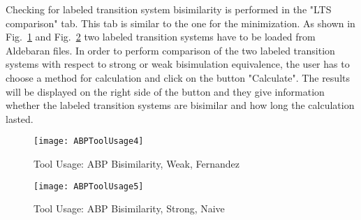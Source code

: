 Checking for labeled transition system bisimilarity is performed in the "LTS comparison" tab. This tab is 
similar to the one for the minimization. As shown in Fig.~\ref{fig:abptoolusage4} and
Fig.~\ref{fig:abptoolusage5} two labeled transition systems have to be loaded from Aldebaran files. In order to perform comparison of the two labeled transition systems with respect to strong or weak bisimulation equivalence, the user has to choose a method for calculation and click on the button 
"Calculate". The results will be displayed on the right side of the button and they
give information whether the labeled transition systems are bisimilar and how long the calculation lasted.

\begin{figure}[h]
\centering
\texttt{[image: ABPToolUsage4]}
\caption{Tool Usage: ABP Bisimilarity, Weak, Fernandez}
\label{fig:abptoolusage4}
\end{figure}

\begin{figure}[h]
\centering
\texttt{[image: ABPToolUsage5]}
\caption{Tool Usage: ABP Bisimilarity, Strong, Naive}
\label{fig:abptoolusage5}
\end{figure}